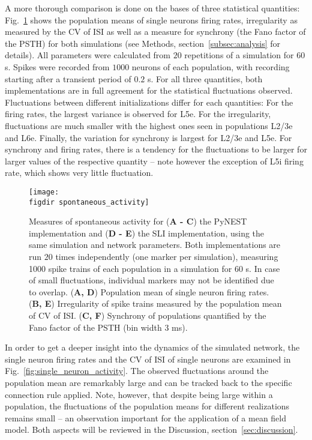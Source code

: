 A more thorough comparison is done on the bases of three statistical quantities: 
Fig.~\ref{fig:spontaneous_activity} shows the population means of single neurons firing rates, 
irregularity as measured by the CV of ISI as well as a measure for synchrony (the Fano factor of the 
PSTH) for both simulations (see Methods, section~\ref{subsec:analysis} for details). 
All parameters were calculated from $20$ repetitions of a simulation for 
$60$ s.
Spikes were recorded from $1000$ neurons of each population, with recording 
starting after a transient period of $0.2$ s. 
For all three quantities, both implementations are in full agreement for the statistical fluctuations
observed. Fluctuations between different initializations differ for each quantities: For the firing rates, 
the largest variance is observed for L5e. For the irregularity, fluctuations are much smaller with the 
highest ones seen in populations L2/3e and L6e. Finally, the variation for synchrony is largest for 
L2/3e and L5e. For synchrony and firing rates, there is a tendency for the fluctuations to be larger for larger
values of the respective quantity -- note however the exception of L5i firing rate, which shows very little
fluctuation.
\begin{figure}[tb]
    \centering
    \texttt{[image: \\figdir spontaneous\_activity]}
    \caption[Spontaneous activity: PyNEST and SLI]{
        Measures of spontaneous activity for
        (\textbf{A - C}) the PyNEST implementation and (\textbf{D - E}) the SLI implementation, 
        using the same simulation and network parameters.
        Both implementations are run $20$ times independently (one marker per simulation),
        measuring 1000 spike trains of each population in a simulation for 60 s.
        In case of small 
        fluctuations, individual markers may not be identified due to overlap. 
        \quad (\textbf{A, D}) Population mean of single neuron firing rates.
        \quad (\textbf{B, E}) Irregularity of spike trains measured by the 
        population mean of CV of ISI.
        \quad (\textbf{C, F}) Synchrony of populations quantified 
        by the Fano factor of the PSTH (bin width 3 ms).
    }
    \label{fig:spontaneous_activity}
\end{figure}

In order to get a deeper insight into the dynamics of the simulated network, the single neuron firing 
rates and the CV of ISI of single neurons are examined in Fig.~\ref{fig:single_neuron_activity}.
The observed fluctuations around the population mean are remarkably large and can 
be tracked back to the specific connection rule applied.
Note, however, that despite being large within a population, the 
fluctuations of the population means for different realizations remains small -- an observation 
important for the application of a mean field model. Both aspects will be reviewed in the 
Discussion, section~\ref{sec:discussion}. 

